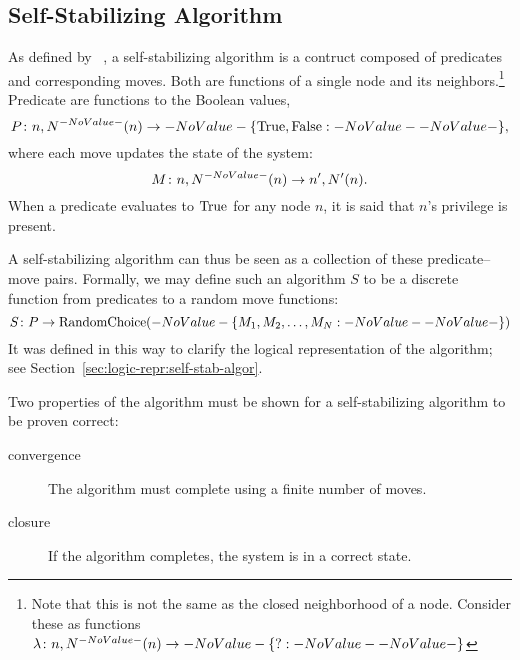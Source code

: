 \subsection{Self-Stabilizing Algorithm}
\label{sec:math-define:self-stab-algor}

As defined by \citeauthor{Dijkstra:1974:SSS:361179.361202}~\autocite{Dijkstra:1974:SSS:361179.361202},
  a self-stabilizing algorithm is a contruct composed of
  predicates and corresponding moves.
Both are functions of a single node and its neighbors.\footnote{%
  Note that this is not the same as the closed neighborhood of a node.
  Consider these as functions $\Function{n, \OpenNeighborhood{n}}{\Set ?}$}
Predicate are functions to the Boolean values,
  \begin{equation}
  \label{eq:define-predicate}
  \Function[P]{n, \OpenNeighborhood{n}}{\SetBoolean},
  \end{equation}
  where each move updates the state of the system:
  \begin{equation}
  \label{eq:define-move}
  \Function[M]{n, \OpenNeighborhood{n}}{n^\prime, \OpenNeighborhood[\prime]{n}}.
  \end{equation}
When a predicate evaluates to $\text{True}$ for any node $n$,
  it is said that $n$'s privilege is present.

A self-stabilizing algorithm can thus be seen as
  a collection of these predicate--move pairs.
Formally, we may define such an algorithm $S$ to be a discrete function
  from predicates to a random move functions:
  \begin{equation}
    \label{eq:define-ssalg}
    \Function[S]{P}{\operatorname{RandomChoice}(\Set{M_1, M_2, \dots, M_N})}
  \end{equation}
It was defined in this way to clarify the logical representation of the algorithm;
  see Section~\ref{sec:logic-repr:self-stab-algor}.

Two properties of the algorithm must be shown
  for a self-stabilizing algorithm to be proven correct:~\autocite{arora:closure-and-convergence}
\begin{description}
\item[convergence] The algorithm must complete using a finite number of moves.
\item[closure] If the algorithm completes, the system is in a correct state.
\end{description}

